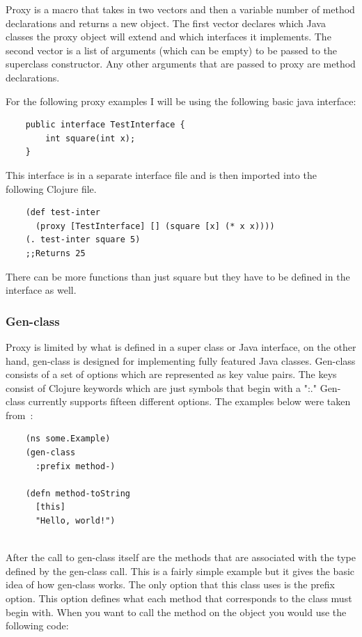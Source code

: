 \documentclass[12pt]{article}
\begin{document}
	Proxy is a macro that takes in two vectors and then a variable number of method declarations and returns a new object. The first vector declares which Java classes the proxy object will extend and which interfaces it implements. The second vector is a list of arguments (which can be empty) to be passed to the superclass constructor. Any other arguments that are passed to proxy are method declarations\cite{cloj:interop}. 
	
	For the following proxy examples I will be using the following basic java interface:
	
	\begin{verbatim}
	public interface TestInterface {
		int square(int x);
	}
	\end{verbatim}
	This interface is in a separate interface file and is then imported into the following Clojure file.
	\begin{verbatim}
	(def test-inter 
	  (proxy [TestInterface] [] (square [x] (* x x))))
	(. test-inter square 5)
	;;Returns 25
	\end{verbatim}
	There can be more functions than just square but they have to be defined in the interface as well.
	
	\subsubsection{Gen-class}
	Proxy is limited by what is defined in a super class or Java interface, on the other hand, gen-class is designed for implementing fully featured Java classes. Gen-class consists of a set of options which are represented as key value pairs. The keys consist of Clojure keywords which are just symbols that begin with a ":." Gen-class currently supports fifteen different options. The examples below were taken from~\cite{kotka}:
	
	\begin{verbatim}
	(ns some.Example)
	(gen-class
	  :prefix method-)
	  
	(defn method-toString
	  [this]
	  "Hello, world!")
	  
	\end{verbatim}
	
	After the call to gen-class itself are the methods that are associated with the type defined by the gen-class call. This is a fairly simple example but it gives the basic idea of how gen-class works. The only option that this class uses is the prefix option. This option defines what each method that corresponds to the class must begin with. When you want to call the method on the object you would use the following code:
	
\end{document}
